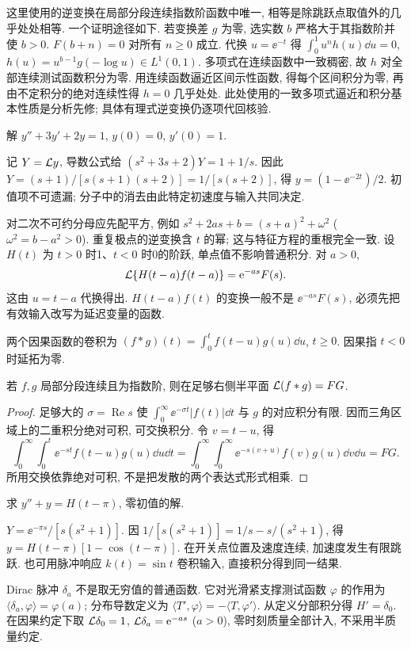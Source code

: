 这里使用的逆变换在局部分段连续指数阶函数中唯一, 相等是除跳跃点取值外的几乎处处相等. 一个证明途径如下. 若变换差 $g$ 为零, 选实数 $b$ 严格大于其指数阶并使 $b>0$. $F(b+n)=0$ 对所有 $n\ge0$ 成立. 代换 $u=\ee^{-t}$ 得 $\int_0^1u^n h(u)\dd u=0$, $h(u)=u^{b-1}g(-\log u)\in L^1(0,1)$. 多项式在连续函数中一致稠密, 故 $h$ 对全部连续测试函数积分为零. 用连续函数逼近区间示性函数, 得每个区间积分为零, 再由不定积分的绝对连续性得 $h=0$ 几乎处处. 此处使用的一致多项式逼近和积分基本性质是分析先修; 具体有理式逆变换仍逐项代回核验.
\begin{example}解 $y''+3y'+2y=1$, $y(0)=0$, $y'(0)=1$.\end{example}
\begin{solution}
记 $Y=\mathcal L y$, 导数公式给 $(s^2+3s+2)Y=1+1/s$. 因此 $Y=(s+1)/[s(s+1)(s+2)]=1/[s(s+2)]$, 得 $y=(1-\ee^{-2t})/2$. 初值项不可遗漏; 分子中的消去由此特定初速度与输入共同决定.
\end{solution}
对二次不可约分母应先配平方, 例如 $s^2+2as+b=(s+a)^2+\omega^2$ ($\omega^2=b-a^2>0$). 重复极点的逆变换含 $t$ 的幂; 这与特征方程的重根完全一致.
设 $H(t)$ 为 $t>0$ 时1、$t<0$ 时0的阶跃, 单点值不影响普通积分. 对 $a>0$,
\[
\mathcal L\{H(t-a)f(t-a)\}=\mathrm e^{-as}F(s).
\]
这由 $u=t-a$ 代换得出. $H(t-a)f(t)$ 的变换一般不是 $\ee^{-as}F(s)$, 必须先把有效输入改写为延迟变量的函数.
\begin{definition}
两个因果函数的卷积为 $(f*g)(t)=\int_0^t f(t-u)g(u)\dd u$, $t\ge0$. 因果指 $t<0$ 时延拓为零.
\end{definition}
\begin{theorem}[卷积公式]
若 $f,g$ 局部分段连续且为指数阶, 则在足够右侧半平面 $\mathcal L(f*g)=FG$.
\end{theorem}
\begin{proof}
足够大的 $\sigma=\operatorname{Re}s$ 使 $\int_0^\infty\ee^{-\sigma t}|f(t)|\dd t$ 与 $g$ 的对应积分有限. 因而三角区域上的二重积分绝对可积, 可交换积分. 令 $v=t-u$, 得
\[
\int_0^\infty\int_0^t\ee^{-st}f(t-u)g(u)\dd u\dd t
=\int_0^\infty\int_0^\infty\ee^{-s(v+u)}f(v)g(u)\dd v\dd u=FG.
\]
所用交换依靠绝对可积, 不是把发散的两个表达式形式相乘.
\end{proof}
\begin{example}求 $y''+y=H(t-\pi)$, 零初值的解.\end{example}
\begin{solution}
$Y=\ee^{-\pi s}/[s(s^2+1)]$. 因 $1/[s(s^2+1)]=1/s-s/(s^2+1)$, 得 $y=H(t-\pi)[1-\cos(t-\pi)]$. 在开关点位置及速度连续, 加速度发生有限跳跃. 也可用脉冲响应 $k(t)=\sin t$ 卷积输入, 直接积分得到同一结果.
\end{solution}
Dirac 脉冲 $\delta_a$ 不是取无穷值的普通函数. 它对光滑紧支撑测试函数 $\varphi$ 的作用为 $\langle\delta_a,\varphi\rangle=\varphi(a)$; 分布导数定义为 $\langle T',\varphi\rangle=-\langle T,\varphi'\rangle$. 从定义分部积分得 $H'=\delta_0$. 在因果约定下取 $\mathcal L\delta_0=1$, $\mathcal L\delta_a=\mathrm e^{-as}$ ($a>0$), 零时刻质量全部计入, 不采用半质量约定.

